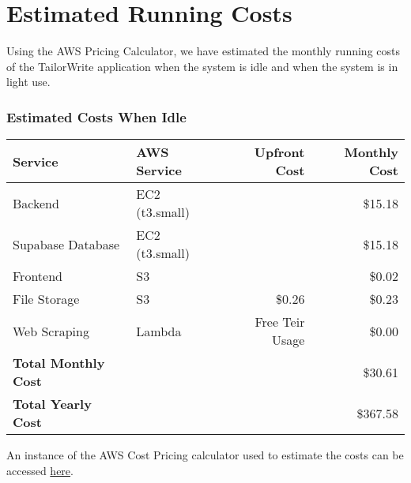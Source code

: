 \documentclass[a4paper, 11pt]{article}
\newcommand{\estimatedCostInIdleURL}{https://calculator.aws/\#/estimate?id=0f82526574f81e22825462ca5893dc9b7381e9a7}
\begin{document}
\section{Estimated Running Costs} 

Using the AWS Pricing Calculator, we have estimated the monthly running costs of the TailorWrite application when the system is idle and when the system is in light use. 


\begin{table}[htbp]
    \subsubsection*{Estimated Costs When Idle}

    \newlength{\tableRowSpacing}
    \setlength{\tableRowSpacing}{3pt}   %

    \centering
    \begin{tabularx}{\textwidth}{XXrr}
    \toprule
    Service             & AWS Service       & Upfront Cost & Monthly Cost \\
    \midrule
    Backend             & EC2 (t3.small)    &               & \$15.18     \\ \addlinespace[\tableRowSpacing]
    Supabase Database   & EC2 (t3.small)    &               & \$15.18     \\ \addlinespace[\tableRowSpacing]
    Frontend            & S3                &               & \$0.02      \\ \addlinespace[\tableRowSpacing]
    File Storage        & S3                & \$0.26        & \$0.23      \\ \addlinespace[\tableRowSpacing]
    Web Scraping        & Lambda            & Free Teir Usage & \$0.00    \\ 
    \midrule
    \textbf{Total Monthly Cost}   &&& \$30.61 \\    \addlinespace[\tableRowSpacing]
    \textbf{Total Yearly Cost}   &&& \$367.58 \\
    \bottomrule
    \end{tabularx}
    
    \raggedright \vspace{1em}
    An instance of the AWS Cost Pricing calculator used to estimate the costs can be accessed \href{\estimatedCostInIdleURL}{here}.
\end{table}
\end{document}
